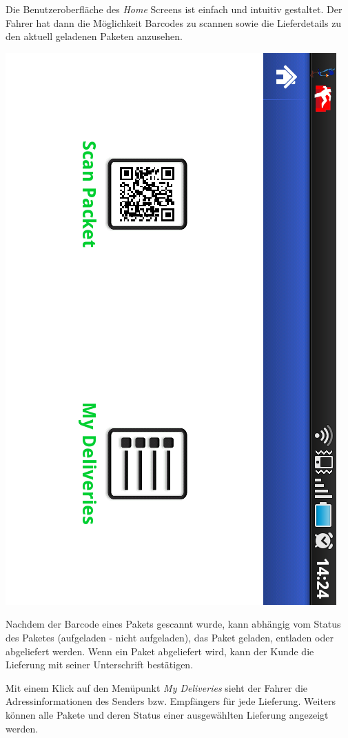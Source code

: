 Die Benutzeroberfläche des \emph{Home} Screens ist einfach und intuitiv gestaltet. Der Fahrer hat dann die Möglichkeit 
Barcodes zu scannen sowie die Lieferdetails zu den aktuell geladenen Paketen anzusehen.

\includegraphics{../files/android_app_home.png}

Nachdem der Barcode eines Pakets gescannt wurde, kann abhängig vom Status des Paketes (aufgeladen - nicht aufgeladen), das Paket
geladen, entladen oder abgeliefert werden. Wenn ein Paket abgeliefert wird, kann der Kunde die Lieferung mit seiner Unterschrift bestätigen.

Mit einem Klick auf den Menüpunkt \emph{My Deliveries} sieht der Fahrer die Adressinformationen des Senders bzw. Empfängers für jede Lieferung.
Weiters können alle Pakete und deren Status einer ausgewählten Lieferung angezeigt werden. 

